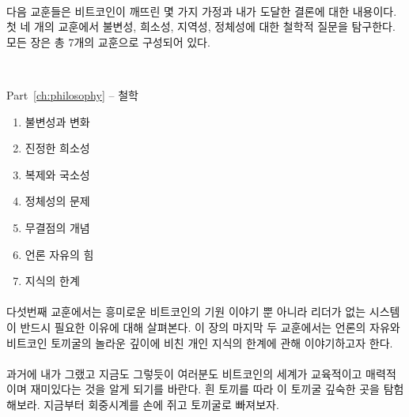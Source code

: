 \paragraph{}
다음 교훈들은 비트코인이 깨뜨린 몇 가지 가정과 내가 도달한 결론에 대한 내용이다. 
첫 네 개의 교훈에서 불변성, 희소성, 지역성, 정체성에 대한 철학적 질문을 탐구한다. 
모든 장은 총 7개의 교훈으로 구성되어 있다.

~

\begin{samepage}
	Part~\ref{ch:philosophy} -- 철학
	
	\begin{enumerate}
		\item 불변성과 변화
		\item 진정한 희소성
		\item 복제와 국소성
		\item 정체성의 문제
		\item 무결점의 개념
		\item 언론 자유의 힘
		\item 지식의 한계
	\end{enumerate}
\end{samepage}

\paragraph{}
다섯번째 교훈에서는 흥미로운 비트코인의 기원 이야기 뿐 아니라 리더가 없는 시스템이 반드시 필요한 이유에 대해 살펴본다. 
이 장의 마지막 두 교훈에서는 언론의 자유와 비트코인 토끼굴의 놀라운 깊이에 비친 개인 지식의 한계에 관해 이야기하고자 한다. 
 
\paragraph{}
과거에 내가 그랬고 지금도 그렇듯이 여러분도 비트코인의 세계가 교육적이고 매력적이며 재미있다는 것을 알게 되기를 바란다. 
흰 토끼를 따라 이 토끼굴 깊숙한 곳을 탐험해보라. 지금부터 회중시계를 손에 쥐고 토끼굴로 빠져보자.
